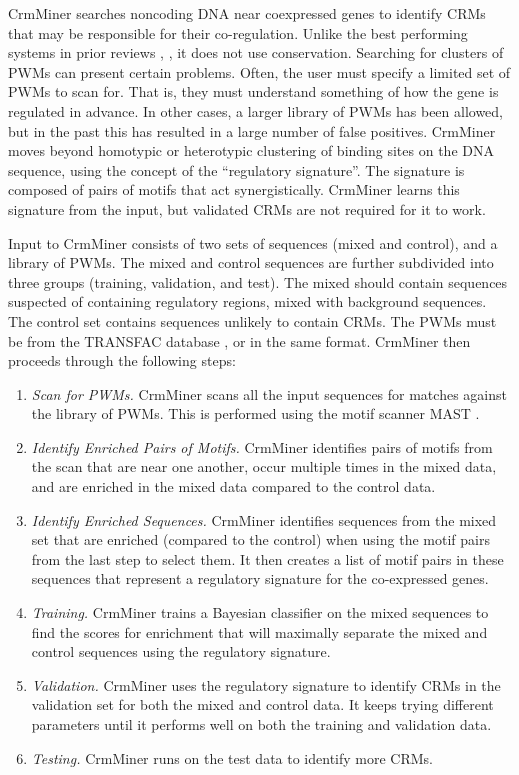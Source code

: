 \documentclass{frontiersENG} %
\begin{document}
CrmMiner \cite{Girgis2012} searches noncoding DNA near coexpressed
genes to identify CRMs that may be responsible for their
co-regulation. Unlike the best performing systems in prior reviews
\cite{Su2010}, \cite{Loo2009}, it does not use conservation. Searching
for clusters of PWMs can present certain problems. Often, the user
must specify a limited set of PWMs to scan for. That is, they must
understand something of how the gene is regulated in advance. In other
cases, a larger library of PWMs has been allowed, but in the past this
has resulted in a large number of false positives. CrmMiner moves
beyond homotypic or heterotypic clustering of binding sites on the DNA
sequence, using the concept of the ``regulatory signature''. The
signature is composed of pairs of motifs that act
synergistically. CrmMiner learns this signature from the input, but
validated CRMs are not required for it to work.

Input to CrmMiner consists of two sets of sequences (mixed and
control), and a library of PWMs. The mixed and control sequences are
further subdivided into three groups (training, validation, and
test). The mixed should contain sequences suspected of containing
regulatory regions, mixed with background sequences. The control set
contains sequences unlikely to contain CRMs. The PWMs must be from the
TRANSFAC database \cite{Matys2003}, or in the same format. CrmMiner
then proceeds through the following steps:

\begin{enumerate}
\item{\textit{Scan for PWMs.} CrmMiner scans all the input sequences
  for matches against the library of PWMs. This is performed using the
  motif scanner MAST \cite{Bailey1998}.}
\item{\textit{Identify Enriched Pairs of Motifs.} CrmMiner identifies
  pairs of motifs from the scan that are near one another, occur
  multiple times in the mixed data, and are enriched in the mixed data
  compared to the control data.}
\item{\textit{Identify Enriched Sequences.} CrmMiner identifies
  sequences from the mixed set that are enriched (compared to the
  control) when using the motif pairs from the last step to select
  them. It then creates a list of motif pairs in these sequences that
  represent a regulatory signature for the co-expressed genes.}
\item{\textit{Training.} CrmMiner trains a Bayesian classifier on the
  mixed sequences to find the scores for enrichment that will
  maximally separate the mixed and control sequences using the
  regulatory signature.}
\item{\textit{Validation.} CrmMiner uses the regulatory signature to
  identify CRMs in the validation set for both the mixed and control
  data. It keeps trying different parameters until it performs well
  on both the training and validation data.}
\item{\textit{Testing.} CrmMiner runs on the test data to identify
  more CRMs.}
\end{enumerate}
\end{document}
